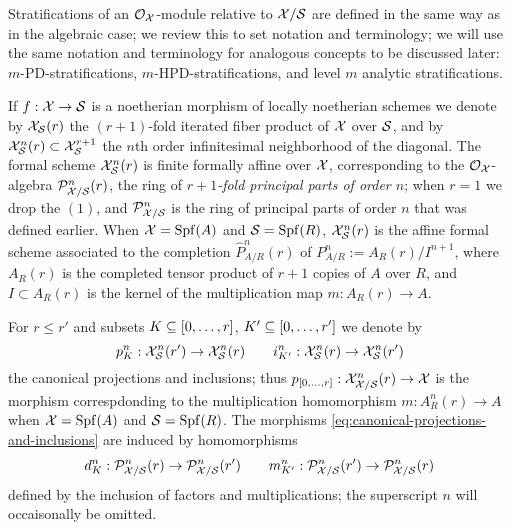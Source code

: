 \documentclass{article}
\theoremstyle{change}
\numberwithin{equation}{subsubsection}
\begin{document}
Stratifications of an ${\cal O}_{\cal X}$-module relative to ${\cal X}/{\cal S}$ are
defined in the same way as in the algebraic case; we review this to
set notation and terminology; we will use the same notation and
terminology for analogous concepts to be discussed later:
$m$-PD-stratifications, $m$-HPD-stratifications, and level $m$
analytic stratifications.

If $f:{\cal X}\to{\cal S}$ is a noetherian morphism of locally noetherian
schemes we denote by ${\cal X}_{\cal S}(r)$ the $(r+1)$-fold iterated fiber
product of ${\cal X}$ over ${\cal S}$, and by ${\cal X}_{\cal S}^n(r)\subset{\cal X}_{\cal S}^{r+1}$
the $n$th order infinitesimal neighborhood of the diagonal. The formal
scheme ${\cal X}^n_{\cal S}(r)$ is finite formally affine over ${\cal X}$,
corresponding to the ${\cal O}_{\cal X}$-algebra ${\cal P}^n_{{\cal X}/{\cal S}}(r)$, the ring
of \textit{$r+1$-fold principal parts of order $n$}; when $r=1$ we
drop the $(1)$, and ${\cal P}^n_{{\cal X}/{\cal S}}$ is the ring of principal parts
of order $n$ that was defined earlier. When ${\cal X}={\operatorname{Spf}({A})}$ and
${\cal S}={\operatorname{Spf}({R})}$, ${\cal X}^n_{\cal S}(r)$ is the affine formal scheme associated
to the completion $\hat P^n_{A/R}(r)$ of $P^n_{A/R}:=A_R(r)/I^{n+1}$,
where $A_R(r)$ is the completed tensor product of $r+1$ copies of $A$
over $R$, and $I\subset A_R(r)$ is the kernel of the multiplication
map $m:A_R(r)\to A$.

For $r\le r'$ and subsets $K\subseteq[0,\ldots,r]$,
$K'\subseteq[0,\ldots,r']$ we denote by
\begin{equation}
  \label{eq:canonical-projections-and-inclusions}
  p^n_K:{\cal X}_{\cal S}^n(r')\to{\cal X}_{\cal S}^n(r)
  \qquad
  i^n_{K'}:{\cal X}_{\cal S}^n(r)\to{\cal X}_{\cal S}^n(r')
\end{equation}
the canonical projections and inclusions; thus
$p_{[0,\ldots,r]}:{\cal X}^n_{{\cal X}/{\cal S}}(r)\to{\cal X}$ is the morphism
correspdonding to the multiplication homomorphism $m:A^n_R(r)\to A$
when ${\cal X}={\operatorname{Spf}({A})}$ and ${\cal S}={\operatorname{Spf}({R})}$. The morphisms
\ref{eq:canonical-projections-and-inclusions} are induced by
homomorphisms
\begin{equation}
  \label{eq:canonical-projections-and-inclusions-ring}
  d^n_K:{\cal P}^n_{{\cal X}/{\cal S}}(r)\to{\cal P}^n_{{\cal X}/{\cal S}}(r')
  \qquad
  m^n_{K'}:{\cal P}^n_{{\cal X}/{\cal S}}(r')\to{\cal P}^n_{{\cal X}/{\cal S}}(r)
\end{equation}
defined by the inclusion of factors and multiplications; the
superscript $n$ will occaisonally be omitted.
\end{document}
